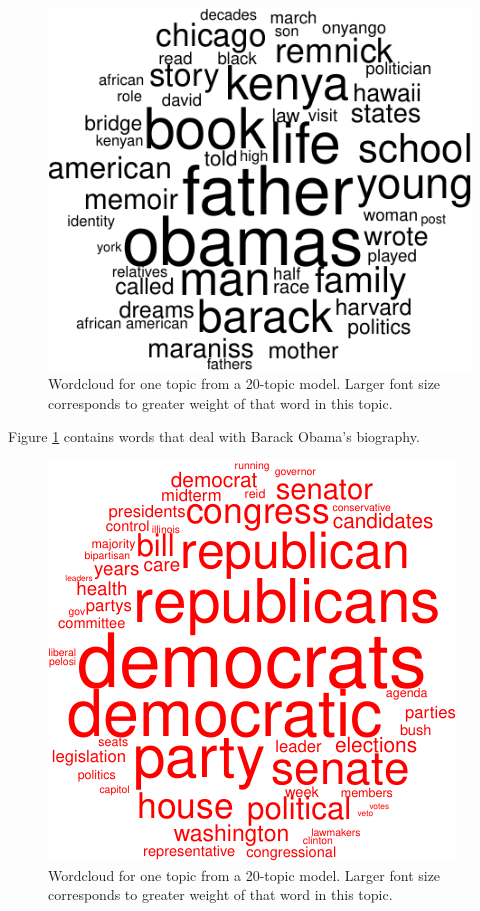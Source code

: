 \documentclass[12pt,]{article}
\begin{document}
\begin{figure}
\includegraphics[width=\textwidth]{2016-03-17-obama_files/figure-latex/wordcloud-4.pdf}
\caption{Wordcloud for one topic from a 20-topic model. Larger font size corresponds to greater weight of that word in this topic.\label{fig:wc4}}
\end{figure}

Figure \ref{fig:wc4} contains words that deal with Barack Obama's
biography.

\begin{figure}
\includegraphics[width=\textwidth]{2016-03-17-obama_files/figure-latex/wordcloud-5.pdf}
\caption{Wordcloud for one topic from a 20-topic model. Larger font size corresponds to greater weight of that word in this topic.\label{fig:wc5}}
\end{figure}
\end{document}
